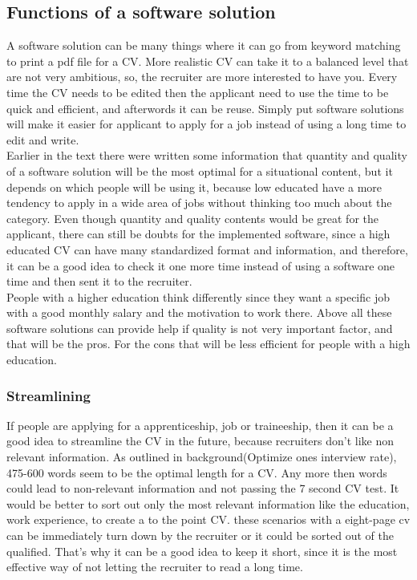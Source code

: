 \subsection{Functions of a software solution}
A software solution can be many things where it can go from keyword matching to print a pdf file for a CV.
More realistic CV can take it to a balanced level that are not very ambitious, 
so, the recruiter are more interested to have you. Every time the CV needs to be edited
then the applicant need to use the time to be quick and efficient, and afterwords it can be reuse.
Simply put software solutions will make it easier for applicant to apply for a job instead of using a long time to edit and write. \\

Earlier in the text there were written some information 
that quantity and quality of a software solution will be the most optimal for a situational content,
but it depends on which people will be using it, because low educated have a more tendency to apply
in a wide area of jobs without thinking too much about the category. 
Even though quantity and quality contents would be great for the applicant, 
there can still be doubts for the implemented software, since a high educated CV can have many standardized format and information,
and therefore, it can be a good idea to check it one more time instead of using a software one time and then sent it to the recruiter. \\

People with a higher education think differently since they want a specific job
with a good monthly salary and the motivation to work there. 
Above all these software solutions can provide help if quality is not very important factor,
and that will be the pros. For the cons that will be less efficient for people with a high education.

\subsubsection{Streamlining}
If people are applying for a apprenticeship, job or traineeship, 
then it can be a good idea to streamline the CV in the future, because recruiters don't like non relevant information.
As outlined in background(Optimize ones interview rate), 475-600 words seem to be the optimal length for a CV.
Any more then words could lead to non-relevant information and not passing the 7 second CV test.
It would be better to sort out only the most relevant information 
like the education, work experience, to create a to the point CV. 
these scenarios with a eight-page cv can be immediately turn down by the recruiter or 
it could be sorted out of the qualified.
That's why it can be a good idea to keep it short, 
since it is the most effective way of not letting the recruiter to read a long time. \\

